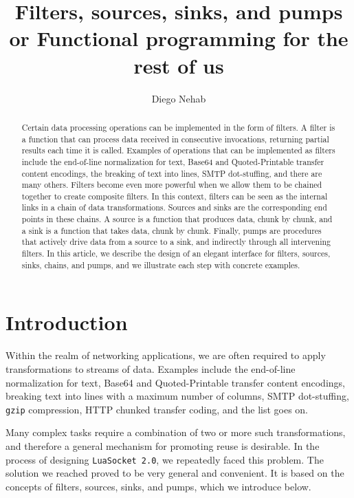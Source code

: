 \documentclass[10pt]{article}
\title{Filters, sources, sinks, and pumps\\
        {\large or Functional programming for the rest of us}}
\author{Diego Nehab}
\begin{document}
			
			\maketitle
			
			\begin{abstract}
			Certain data processing operations can be implemented in the
			form of filters. A filter is a function that can process
			data received in consecutive invocations, returning partial
			results each time it is called.  Examples of operations that
			can be implemented as filters include the end-of-line
			normalization for text, Base64 and Quoted-Printable transfer
			content encodings, the breaking of text into lines, SMTP
			dot-stuffing, and there are many others.  Filters become
			even more powerful when we allow them to be chained together
			to create composite filters. In this context, filters can be
			seen as the internal links in a chain of data transformations.
			Sources and sinks are the corresponding end points in these
			chains. A source is a function that produces data, chunk by
			chunk, and a sink is a function that takes data, chunk by
			chunk. Finally, pumps are procedures that actively drive
			data from a source to a sink, and indirectly through all 
			intervening filters.  In this article, we describe the design of an
			elegant interface for filters, sources, sinks, chains, and
			pumps, and we illustrate each step with concrete examples. 
			\end{abstract}
			
			\section{Introduction}
			
			Within the realm of networking applications, we are often
			required to apply transformations to streams of data. Examples
			include the end-of-line normalization for text, Base64 and
			Quoted-Printable transfer content encodings, breaking text
			into lines with a maximum number of columns, SMTP
			dot-stuffing, \texttt{gzip} compression, HTTP chunked
			transfer coding, and the list goes on.
			
			Many complex tasks require a combination of two or more such
			transformations, and therefore a general mechanism for
			promoting reuse is desirable. In the process of designing
			\texttt{LuaSocket~2.0}, we repeatedly faced this problem.
			The solution we reached proved to be very general and
			convenient. It is based on the concepts of filters, sources,
			sinks, and pumps, which we introduce below. 
			
\end{document}
